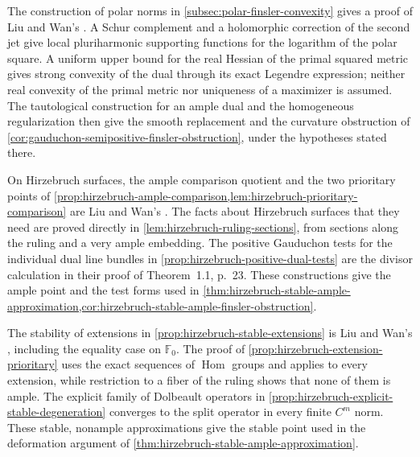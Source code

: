 The construction of polar norms in \cref{subsec:polar-finsler-convexity} gives a proof of Liu and Wan's \cite[v1, Proposition~3.5, pp.~14--16]{LiuWanKobayashi26}. A Schur complement and a holomorphic correction of the second jet give local pluriharmonic supporting functions for the logarithm of the polar square. A uniform upper bound for the real Hessian of the primal squared metric gives strong convexity of the dual through its exact Legendre expression; neither real convexity of the primal metric nor uniqueness of a maximizer is assumed. The tautological construction for an ample dual and the homogeneous regularization then give the smooth replacement and the curvature obstruction of \cref{cor:gauduchon-semipositive-finsler-obstruction}, under the hypotheses stated there.

On Hirzebruch surfaces, the ample comparison quotient and the two prioritary points of \cref{prop:hirzebruch-ample-comparison,lem:hirzebruch-prioritary-comparison} are Liu and Wan's \cite[v1, Proposition~4.2 and Lemma~4.3, pp.~17--20]{LiuWanKobayashi26}. The facts about Hirzebruch surfaces that they need are proved directly in \cref{lem:hirzebruch-ruling-sections}, from sections along the ruling and a very ample embedding. The positive Gauduchon tests for the individual dual line bundles in \cref{prop:hirzebruch-positive-dual-tests} are the divisor calculation in their proof of Theorem~1.1, p.~23. These constructions give the ample point and the test forms used in \cref{thm:hirzebruch-stable-ample-approximation,cor:hirzebruch-stable-ample-finsler-obstruction}.

The stability of extensions in \cref{prop:hirzebruch-stable-extensions} is Liu and Wan's \cite[v1, Proposition~4.4, pp.~20--21]{LiuWanKobayashi26}, including the equality case on $\mathbb F_0$. The proof of \cref{prop:hirzebruch-extension-prioritary} uses the exact sequences of $\operatorname{Hom}$ groups and applies to every extension, while restriction to a fiber of the ruling shows that none of them is ample. The explicit family of Dolbeault operators in \cref{prop:hirzebruch-explicit-stable-degeneration} converges to the split operator in every finite $C^m$ norm. These stable, nonample approximations give the stable point used in the deformation argument of \cref{thm:hirzebruch-stable-ample-approximation}.

